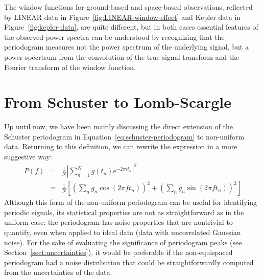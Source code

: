 \documentclass[preprint]{aastex}
\newcommand{\fig}[1]{Figure~\ref{fig:#1}}
\newcommand{\Eq}[1]{Equation~\ref{eq:#1}}
\newcommand{\eq}[1]{\Eq{#1}}
\newcommand{\eqlabel}[1]{\label{eq:#1}}
\newcommand{\Sect}[1]{Section~\ref{sect:#1}}
\newcommand{\sect}[1]{\Sect{#1}}
\newcommand{\sectlabel}[1]{\label{sect:#1}}
\begin{document}
The window functions for ground-based and space-based observations, reflected
by LINEAR data in \fig{LINEAR-window-effect} and Kepler data in
\fig{kepler-data}, are quite different, but in both cases essential features
of the observed power spectra can be understood by recognizing that the
periodogram measures
not the power spectrum of the underlying signal, but a power specrtrum from
the convolution of the true signal transform and the Fourier transform of
the window function.


\section{From Schuster to Lomb-Scargle}
\sectlabel{schuster-to-lomb-scargle}

Up until now, we have been mainly discussing the direct extension of the
Schuster periodogram in \eq{schuster-periodogram} to non-uniform data.
Returning to this definition, we can rewrite the expression in a more
suggestive way:
\begin{eqnarray}
  P(f)
  &=& \frac{1}{N}\left|\sum_{n=1}^N g(t_n)e^{-2\pi i t_n} \right|^2 \nonumber\\
  &=& \frac{1}{N}\left[
    \left(\sum_n g_n \cos(2\pi f t_n)\right)^2
    + \left(\sum_n g_n \sin(2\pi f t_n)\right)^2
    \right]
  \eqlabel{classical-periodogram}
\end{eqnarray}
Although this form of the non-uniform periodogram can be useful for identifying
periodic signals, its statistical properties are not as straightforward as in
the uniform case: the periodogram has noise properties that are nontrivial
to quantify, even when applied to ideal data (data with uncorrelated
Gaussian noise).
For the sake of evaluating the significance of periodogram peaks
(see \sect{uncertainties}), it would be preferable if the non-equispaced
periodogram had a noise distribution that could be 
straightforwardly computed from the uncertainties of the data.
\end{document}
